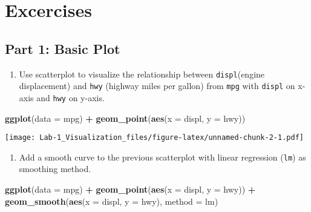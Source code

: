 \documentclass[]{article}
\newenvironment{Shaded}{\begin{snugshade}}{\end{snugshade}}
\newcommand{\DataTypeTok}[1]{\textcolor[rgb]{0.13,0.29,0.53}{#1}}
\newcommand{\KeywordTok}[1]{\textcolor[rgb]{0.13,0.29,0.53}{\textbf{#1}}}
\newcommand{\NormalTok}[1]{#1}
\newcommand{\OperatorTok}[1]{\textcolor[rgb]{0.81,0.36,0.00}{\textbf{#1}}}
\newcommand{\StringTok}[1]{\textcolor[rgb]{0.31,0.60,0.02}{#1}}
\providecommand{\tightlist}{%
  \setlength{\itemsep}{0pt}\setlength{\parskip}{0pt}}
\begin{document}
\hypertarget{excercises}{%
\section{Excercises}\label{excercises}}

\hypertarget{part-1-basic-plot}{%
\subsection{Part 1: Basic Plot}\label{part-1-basic-plot}}

\begin{enumerate}
\def\labelenumi{\alph{enumi}.}
\tightlist
\item
  Use scatterplot to visualize the relationship between
  \texttt{displ}(engine displacement) and \texttt{hwy} (highway miles
  per gallon) from \texttt{mpg} with \texttt{displ} on x-axis and
  \texttt{hwy} on y-axis.
\end{enumerate}

\begin{Shaded}
\begin{Highlighting}[]
\KeywordTok{ggplot}\NormalTok{(}\DataTypeTok{data =}\NormalTok{ mpg) }\OperatorTok{+}
\StringTok{  }\KeywordTok{geom_point}\NormalTok{(}\KeywordTok{aes}\NormalTok{(}\DataTypeTok{x =}\NormalTok{ displ, }\DataTypeTok{y =}\NormalTok{ hwy))}
\end{Highlighting}
\end{Shaded}

\texttt{[image: Lab-1\_Visualization\_files/figure-latex/unnamed-chunk-2-1.pdf]}

\begin{enumerate}
\def\labelenumi{\alph{enumi}.}
\setcounter{enumi}{1}
\tightlist
\item
  Add a smooth curve to the previous scatterplot with linear regression
  (\texttt{lm}) as smoothing method.
\end{enumerate}

\begin{Shaded}
\begin{Highlighting}[]
\KeywordTok{ggplot}\NormalTok{(}\DataTypeTok{data =}\NormalTok{ mpg) }\OperatorTok{+}
\StringTok{  }\KeywordTok{geom_point}\NormalTok{(}\KeywordTok{aes}\NormalTok{(}\DataTypeTok{x =}\NormalTok{ displ, }\DataTypeTok{y =}\NormalTok{ hwy)) }\OperatorTok{+}
\StringTok{    }\KeywordTok{geom_smooth}\NormalTok{(}\KeywordTok{aes}\NormalTok{(}\DataTypeTok{x =}\NormalTok{ displ, }\DataTypeTok{y =}\NormalTok{ hwy), }\DataTypeTok{method =}\NormalTok{ lm)}
\end{Highlighting}
\end{Shaded}
\end{document}
